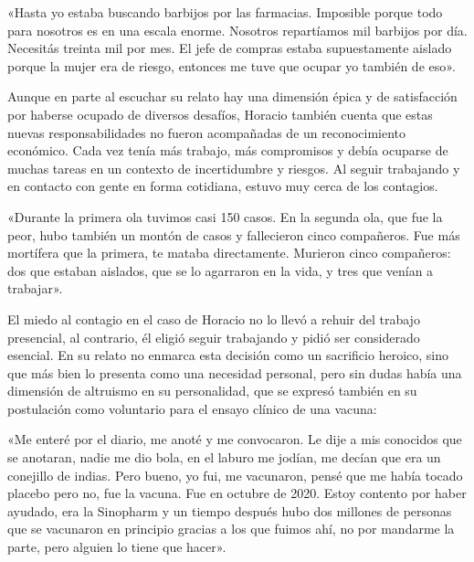 \begin{refsection}
\begin{gbcita}
«Hasta yo estaba buscando barbijos por las farmacias. Imposible porque todo para nosotros es en una escala enorme. Nosotros repartíamos mil barbijos por día. Necesitás treinta mil por mes. El jefe de compras estaba supuestamente aislado porque la mujer era de riesgo, entonces me tuve que ocupar yo también de eso».

\end{gbcita}

Aunque en parte al escuchar su relato hay una dimensión épica y de satisfacción por haberse ocupado de diversos desafíos, Horacio también cuenta que estas nuevas responsabilidades no fueron acompañadas de un reconocimiento económico. Cada vez tenía más trabajo, más compromisos y debía ocuparse de muchas tareas en un contexto de incertidumbre y riesgos. Al seguir trabajando y en contacto con gente en forma cotidiana, estuvo muy cerca de los contagios.


\begin{gbcita}
«Durante la primera ola tuvimos casi 150 casos. En la segunda ola, que fue la peor, hubo también un montón de casos y fallecieron cinco compañeros. Fue más mortífera que la primera, te mataba directamente. Murieron cinco compañeros: dos que estaban aislados, que se lo agarraron en la vida, y tres que venían a trabajar».

\end{gbcita}

El miedo al contagio en el caso de Horacio no lo llevó a rehuir del trabajo presencial, al contrario, él eligió seguir trabajando y pidió ser considerado esencial. En su relato no enmarca esta decisión como un sacrificio heroico, sino que más bien lo presenta como una necesidad personal, pero sin dudas había una dimensión de altruismo en su personalidad, que se expresó también en su postulación como voluntario para el ensayo clínico de una vacuna:


\begin{gbcita}
«Me enteré por el diario, me anoté y me convocaron. Le dije a mis conocidos que se anotaran, nadie me dio bola, en el laburo me jodían, me decían que era un conejillo de indias. Pero bueno, yo fui, me vacunaron, pensé que me había tocado placebo pero no, fue la vacuna. Fue en octubre de 2020. Estoy contento por haber ayudado, era la Sinopharm y un tiempo después hubo dos millones de personas que se vacunaron en principio gracias a los que fuimos ahí, no por mandarme la parte, pero alguien lo tiene que hacer».


\end{gbcita}
\end{refsection}
